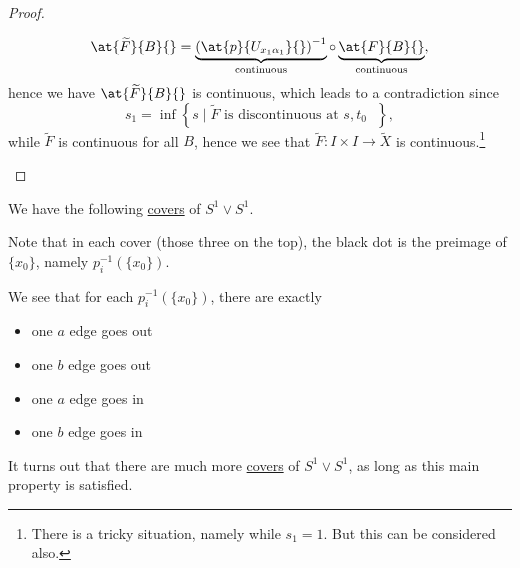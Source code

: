 \begin{proof}
\begin{enumerate}[(1)]
		      \[
			      \at{\widetilde{F} }{B}{} = \underbrace{\left(\at{p}{U_{x_1 \alpha _1}}{} \right)^{-1}}_{\text{continuous} } \circ \underbrace{\vphantom{\left(\at{p}{U_{x_1 \alpha _1}}{} \right)^{-1}}\at{F}{B}{}}_{\text{continuous} },
		      \]
		      hence we have \(\at{\widetilde{F} }{B}{} \) is continuous, which leads to a contradiction since
		      \[
			      s_1 = \inf \left\{s\mid \widetilde{F} \text{ is discontinuous at \(s, t_0\) } \right\},
		      \]
		      while \(\widetilde{F} \) is continuous for all \(B\), hence we see that \(\widetilde{F} :I\times I\to \widetilde{X} \) is continuous.\footnote{There is a tricky situation, namely while \(s_1 = 1\). But this can be considered also.}
	\end{enumerate}
\end{proof}

\begin{eg}
	We have the following \hyperref[def:covering-map]{covers} of \(S^1 \vee S^1\).
	\begin{figure}[H]
		\centering
		\label{fig:eg:lec14:1}
	\end{figure}
	Note that in each cover (those three on the top), the black dot is the preimage of \(\{x_0\}\), namely \(p_{i}^{-1} (\{x_0\})\).
	\begin{remark}
		We see that for each \(p_{i}^{-1} (\{x_0\})\), there are exactly
		\begin{itemize}
			\item one \(a\) edge goes out
			\item one \(b\) edge goes out
			\item one \(a\) edge goes in
			\item one \(b\) edge goes in
		\end{itemize}

		It turns out that there are much more \hyperref[def:covering-map]{covers} of \(S^1\vee S^1\), as long as this main property is satisfied.
	\end{remark}
\end{eg}

